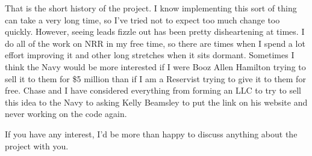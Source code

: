 \documentclass[UTF8]{article}
\begin{document}
That is the short history of the project. I know implementing this sort of thing can take a very long time, so I've tried not to expect too much change too quickly. However, seeing leads fizzle out has been pretty disheartening at times. I do all of the work on NRR in my free time, so there are times when I spend a lot effort improving it and other long stretches when it sits dormant. Sometimes I think the Navy would be more interested if I were Booz Allen Hamilton trying to sell it to them for \$5 million than if I am a Reservist trying to give it to them for free. Chase and I have considered everything from forming an LLC to try to sell this idea to the Navy to asking Kelly Beamsley to put the link on his website and never working on the code again.

If you have any interest, I'd be more than happy to discuss anything about the project with you.
\end{document}
